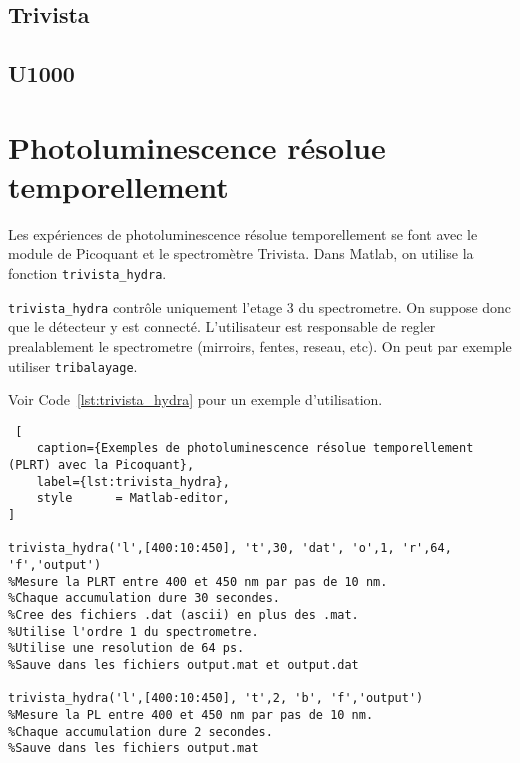 \documentclass[11pt,francais]{book} %
\begin{document}
\subsection{Trivista}

\subsection{U1000}

\section{Photoluminescence résolue temporellement}

Les expériences de photoluminescence résolue temporellement se font avec le module de Picoquant et le spectromètre Trivista.
Dans Matlab, on utilise la fonction \lstinline{trivista_hydra}.

\lstinline{trivista_hydra} contrôle uniquement l'etage 3 du spectrometre. On suppose donc que le détecteur y est connecté. L'utilisateur est responsable de regler prealablement le spectrometre (mirroirs, fentes, reseau, etc). On peut par exemple utiliser \lstinline{tribalayage}.

Voir Code~\ref{lst:trivista_hydra} pour un exemple d'utilisation.

\begin{lstlisting} [
    caption={Exemples de photoluminescence résolue temporellement (PLRT) avec la Picoquant},
    label={lst:trivista_hydra},
    style      = Matlab-editor,
]

trivista_hydra('l',[400:10:450], 't',30, 'dat', 'o',1, 'r',64, 'f','output') 
%Mesure la PLRT entre 400 et 450 nm par pas de 10 nm.
%Chaque accumulation dure 30 secondes.
%Cree des fichiers .dat (ascii) en plus des .mat.
%Utilise l'ordre 1 du spectrometre.
%Utilise une resolution de 64 ps.
%Sauve dans les fichiers output.mat et output.dat

trivista_hydra('l',[400:10:450], 't',2, 'b', 'f','output') 
%Mesure la PL entre 400 et 450 nm par pas de 10 nm.
%Chaque accumulation dure 2 secondes.
%Sauve dans les fichiers output.mat

\end{lstlisting}
\end{document}
